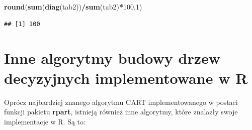 \documentclass[
]{book}
\newenvironment{Shaded}{\begin{snugshade}}{\end{snugshade}}
\newcommand{\DecValTok}[1]{\textcolor[rgb]{0.00,0.00,0.81}{#1}}
\newcommand{\KeywordTok}[1]{\textcolor[rgb]{0.13,0.29,0.53}{\textbf{#1}}}
\newcommand{\NormalTok}[1]{#1}
\newcommand{\OperatorTok}[1]{\textcolor[rgb]{0.81,0.36,0.00}{\textbf{#1}}}
\theoremstyle{plain}
\theoremstyle{definition}
\theoremstyle{definition}
\theoremstyle{definition}
\theoremstyle{definition}
\theoremstyle{remark}
\begin{document}
\begin{Shaded}
\begin{Highlighting}[]
\KeywordTok{round}\NormalTok{(}\KeywordTok{sum}\NormalTok{(}\KeywordTok{diag}\NormalTok{(tab2))}\OperatorTok{/}\KeywordTok{sum}\NormalTok{(tab2)}\OperatorTok{*}\DecValTok{100}\NormalTok{,}\DecValTok{1}\NormalTok{)}
\end{Highlighting}
\end{Shaded}

\begin{verbatim}
## [1] 100
\end{verbatim}

\hypertarget{inne-algorytmy-budowy-drzew-decyzyjnych-implementowane-w-r}{%
\section{\texorpdfstring{Inne algorytmy budowy drzew decyzyjnych implementowane w \textbf{R}}{Inne algorytmy budowy drzew decyzyjnych implementowane w R}}\label{inne-algorytmy-budowy-drzew-decyzyjnych-implementowane-w-r}}

Oprócz najbardziej znanego algorytmu CART implementowanego w postaci funkcji pakietu \textbf{rpart}, istnieją również inne algorytmy, które znalazły swoje implementacje w R. Są to:
\end{document}
